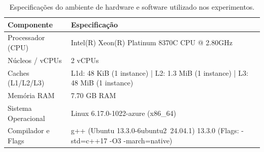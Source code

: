 \begin{table}[htbp]
\centering
\caption{Especificações do ambiente de hardware e software utilizado nos experimentos.}
\label{tab:ambiente_experimental}
\begin{tabular}{ll}
\hline
\textbf{Componente} & \textbf{Especificação} \\
\hline
Processador (CPU) & Intel(R) Xeon(R) Platinum 8370C CPU @ 2.80GHz \\
Núcleos / vCPUs & 2 vCPUs \\
Caches (L1/L2/L3) & L1d: 48 KiB (1 instance) | L2: 1.3 MiB (1 instance) | L3: 48 MiB (1 instance) \\
Memória RAM & 7.70 GB RAM \\
Sistema Operacional & Linux 6.17.0-1022-azure (x86\_64) \\
Compilador e Flags & g++ (Ubuntu 13.3.0-6ubuntu2~24.04.1) 13.3.0 (Flags: -std=c++17 -O3 -march=native) \\
\hline
\end{tabular}
\end{table}

